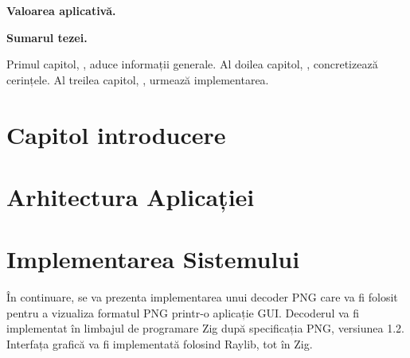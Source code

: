 \documentclass[a4paper,12pt]{report}
\begin{document}
\textbf{Valoarea aplicativă.}

\textbf{Sumarul tezei.}

Primul capitol, , aduce informații generale.
Al doilea capitol, , concretizează cerințele.
Al treilea capitol, , urmează implementarea.


\chapter{Capitol introducere}\label{intro_chapter_title}



\chapter{Arhitectura Aplicației}\label{architecture_chapter_title}



\chapter{Implementarea Sistemului}\label{implementation_chapter_title}

În continuare, se va prezenta implementarea unui decoder PNG care va fi folosit
pentru a vizualiza formatul PNG printr-o aplicație \ac{GUI}. 
Decoderul va fi implementat în limbajul de programare Zig\cite{zig} după specificația \ac{PNG}, versiunea 1.2\cite{png_spec}.
Interfața grafică va fi implementată folosind Raylib\cite{raylib}, tot în Zig.
\end{document}
